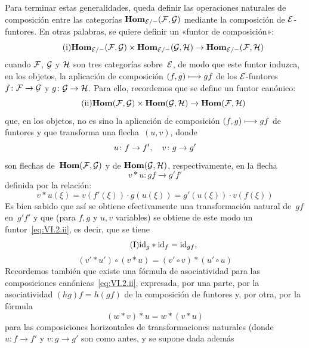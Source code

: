 Para terminar estas generalidades, queda definir las operaciones naturales de
composición entre las categorías $\SheafHom_{\cal{E}/-}(\cal{F},\cal{G})$
mediante la composición de $\cal{E}$-funtores. En otras palabras, se quiere
definir un
«funtor de composición»:
\begin{equation*}
\label{eq:VI.2.i}
\tag{i} {\SheafHom_{\cal{E}/-}(\cal{F},\cal{G})\times
\SheafHom_{\cal{E}/-}(\cal{G},\cal{H})\to
\SheafHom_{\cal{E}/-}(\cal{F},\cal{H})}
\end{equation*}
cuando $\cal{F}$, $\cal{G}$ y $\cal{H}$ son tres categorías sobre~$\cal{E}$,
de modo que este funtor induzca, en los objetos, la aplicación de composición
$(f,g)\mto gf$ de los $\cal{E}$-funtores
$f\colon\cal{F}\to\cal{G}$ y $g\colon \cal{G}\to\cal{H}$. Para ello,
recordemos que se define un funtor canónico:
\begin{equation*}
\label{eq:VI.2.ii}
\tag{ii}
{\SheafHom(\cal{F},\cal{G})\times\SheafHom(\cal{G},\cal{H})\to
\SheafHom(\cal{F},\cal{H})}
\end{equation*}
que, en los objetos, no es sino la aplicación de composición $(f,g)\mto gf$ de
funtores y que transforma una flecha~$(u,v)$, donde
$$
u\colon f\to f'\quoi,\quad v\colon g\to g'
$$
son flechas de~$\SheafHom(\cal{F},\cal{G})$ y de
$\SheafHom(\cal{G},\cal{H})$, respectivamente, en la flecha
$$
v*u\colon gf\to g'f'
$$
\label{indnot:fj}%
definida por la relación:
$$
v*u(\xi)=v(f'(\xi))\cdot g(u(\xi))=g'(u(\xi))\cdot v(f(\xi))
$$
Es bien sabido que así se obtiene efectivamente una transformación natural
de~$gf$ en~$g'f'$ y que (para $f,g$ y $u,v$ variables) se obtiene de este modo
un funtor~\eqref{eq:VI.2.ii}, es decir, que se tiene
\begin{equation*}
\label{eq:VI.2.I}
\tag{I} {\id_g*\id_f=\id_{gf}\quoi,}
\end{equation*}
\begin{equation*}
\label{eq:VI.2.II}
\tag{II} {(v'*u')\circ(v*u)=(v'\circ v)*(u'\circ u)}
\end{equation*}
Recordemos también que existe una fórmula de asociatividad para las
composiciones canónicas~\eqref{eq:VI.2.ii}, expresada, por una parte, por la
asociatividad $(hg)f=h(gf)$ de la composición de funtores y, por otra, por la
fórmula
\begin{equation*}
\label{eq:VI.2.III}
\tag{III} {(w*v)*u=w*(v*u)}
\end{equation*}
para las composiciones horizontales de transformaciones naturales (donde
$u\colon f\to f'$ y $v\colon g\to g'$ son como antes, y se supone dada además
